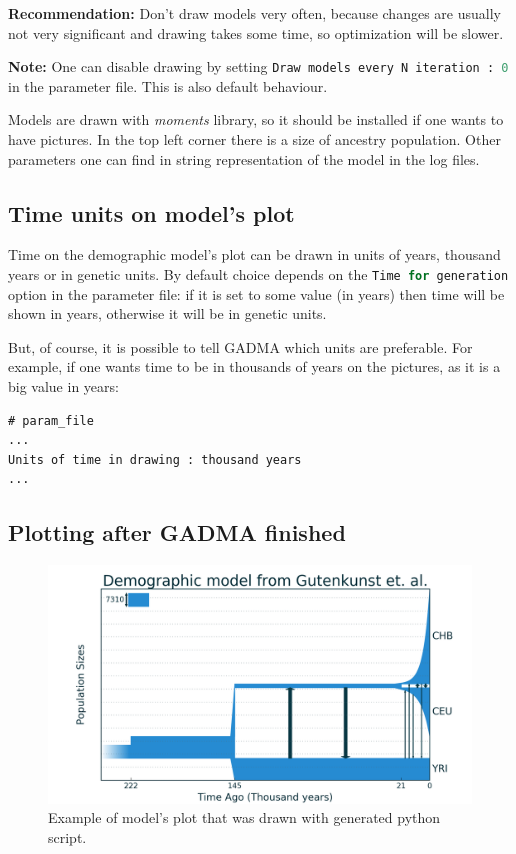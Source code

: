 \documentclass[12pt]{article}
\makeatletter
\newcommand{\moments}{\textit{moments}\xspace}
\newcommand{\py}[1]{\lstinline[language=Python, showstringspaces=False]@#1@}
\makeatother
\begin{document}
\textbf{Recommendation:} Don't draw models very often, because changes are usually not very significant and drawing takes some time, so optimization will be slower.

\textbf{Note:} One can disable drawing by setting \py{Draw models every N iteration : 0 } in the parameter file. This is also default behaviour.

Models are drawn with \moments library, so it should be installed if one wants to have pictures. In the top left corner there is a size of ancestry population. Other parameters one can find in string representation of the model in the log files.

\subsection{Time units on model's plot}
Time on the demographic model's plot can be drawn in units of years,  thousand years or in genetic units. By default choice depends on the \py{Time for generation} option in the parameter file: if it is set to some value (in years) then time will be shown in years, otherwise it will be in genetic units.

But, of course, it is possible to tell GADMA which units are preferable. For example, if one wants time to be in thousands of years on the pictures, as it is a big value in years:

\begin{lstlisting}
# param_file
...
Units of time in drawing : thousand years
...
\end{lstlisting}

\subsection{Plotting after GADMA finished}

\begin{figure}[h]
    \centering
    \includegraphics[width=0.6\linewidth]{3d_lim_model_dadi.png}
    \caption{Example of model's plot that was drawn with generated python script.}
    \label{fig:my_label}
\end{figure}
\end{document}
